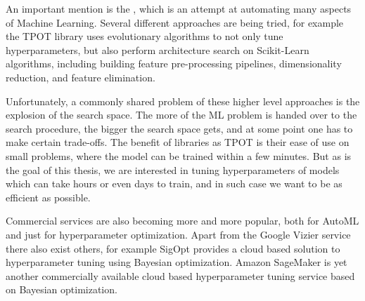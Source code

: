 An important mention is the \cite{automl}, which is an attempt at automating
many aspects of Machine Learning. Several different approaches are being tried,
for example the TPOT \citep{tpot} library uses evolutionary algorithms to not
only tune hyperparameters, but also perform architecture search on Scikit-Learn
algorithms, including building feature pre-processing pipelines, dimensionality
reduction, and feature elimination.

Unfortunately, a commonly shared problem of these higher level approaches is
the explosion of the search space. The more of the ML problem is handed over to
the search procedure, the bigger the search space gets, and at some point one
has to make certain trade-offs. The benefit of libraries as TPOT is their ease
of use on small problems, where the model can be trained within a few minutes.
But as is the goal of this thesis, we are interested in tuning hyperparameters
of models which can take hours or even days to train, and in such case we want
to be as efficient as possible.

Commercial services are also becoming more and more popular, both for AutoML
and just for hyperparameter optimization. Apart from the Google Vizier service
\citep{google-vizier} there also exist others, for example SigOpt
\citep{sigopt} provides a cloud based solution to hyperparameter tuning using
Bayesian optimization. Amazon SageMaker \citep{amazon-sagemaker} is yet another
commercially available cloud based hyperparameter tuning service based on
Bayesian optimization.



